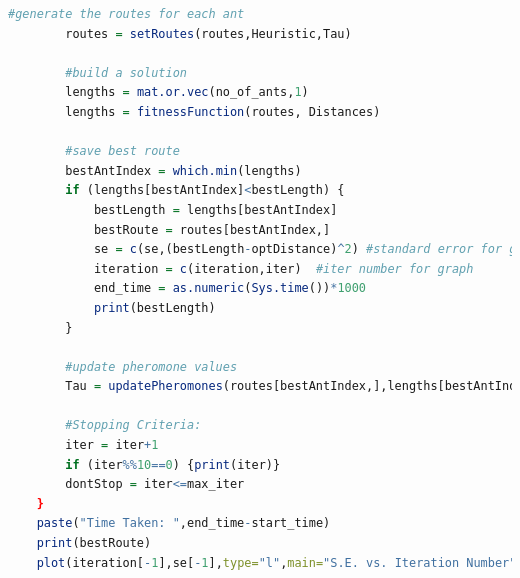 \documentclass[11pt,a4paper,final]{article}
\begin{document}
\begin{lstlisting}[language = R, caption= ACO Code, label=ACOCode]
		#generate the routes for each ant
		routes = setRoutes(routes,Heuristic,Tau)
	
		#build a solution
		lengths = mat.or.vec(no_of_ants,1)
		lengths = fitnessFunction(routes, Distances)
	
		#save best route
		bestAntIndex = which.min(lengths)
		if (lengths[bestAntIndex]<bestLength) {
			bestLength = lengths[bestAntIndex]
			bestRoute = routes[bestAntIndex,]
			se = c(se,(bestLength-optDistance)^2) #standard error for graph
			iteration = c(iteration,iter)  #iter number for graph
			end_time = as.numeric(Sys.time())*1000
			print(bestLength)
		}
	
		#update pheromone values
		Tau = updatePheromones(routes[bestAntIndex,],lengths[bestAntIndex],evaporation_rate,Tau)
	
		#Stopping Criteria:
		iter = iter+1
		if (iter%%10==0) {print(iter)}
		dontStop = iter<=max_iter
	}
	paste("Time Taken: ",end_time-start_time)
	print(bestRoute)
	plot(iteration[-1],se[-1],type="l",main="S.E. vs. Iteration Number",xlab="Iteration",ylab="S.E.")
	\end{lstlisting}
	\pagebreak
\end{document}

